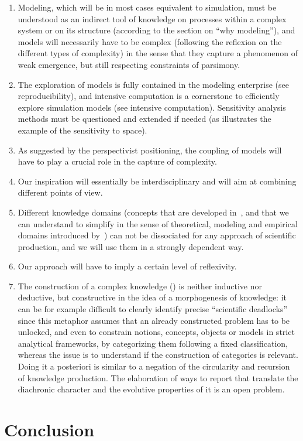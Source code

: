 \begin{enumerate}
	\item Modeling, which will be in most cases equivalent to simulation, must be understood as an indirect tool of knowledge on processes within a complex system or on its structure (according to the section on ``why modeling''), and models will necessarily have to be complex (following the reflexion on the different types of complexity) in the sense that they capture a phenomenon of weak emergence, but still respecting constraints of parsimony.
	\item The exploration of models is fully contained in the modeling enterprise (see reproducibility), and intensive computation is a cornerstone to efficiently explore simulation models (see intensive computation). Sensitivity analysis methods must be questioned and extended if needed (as illustrates the example of the sensitivity to space).
	\item As suggested by the perspectivist positioning, the coupling of models will have to play a crucial role in the capture of complexity.
	\item Our inspiration will essentially be interdisciplinary and will aim at combining different points of view.
	\item Different knowledge domains (concepts that are developed in~\cite{raimbault2017applied}, and that we can understand to simplify in the sense of theoretical, modeling and empirical domains introduced by~\cite{livet2010}) can not be dissociated for any approach of scientific production, and we will use them in a strongly dependent way.
	\item Our approach will have to imply a certain level of reflexivity.
	\item The construction of a complex knowledge (\cite{morin1991methode}) is neither inductive nor deductive, but constructive in the idea of a morphogenesis of knowledge: it can be for example difficult to clearly identify precise ``scientific deadlocks'' since this metaphor assumes that an already constructed problem has to be unlocked, and even to constrain notions, concepts, objects or models in strict analytical frameworks, by categorizing them following a fixed classification, whereas the issue is to understand if the construction of categories is relevant. Doing it a posteriori is similar to a negation of the circularity and recursion of knowledge production. The elaboration of ways to report that translate the diachronic character and the evolutive properties of it is an open problem.
\end{enumerate}




\section*{Conclusion}
















